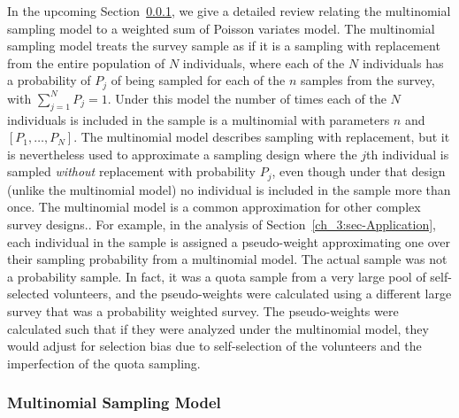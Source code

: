 In the upcoming Section~\ref{ch_3:sec-MultPoisson}, we give a detailed review relating the multinomial sampling model to a weighted sum of Poisson variates model.
The multinomial sampling model treats the survey sample as if it is a sampling with replacement from the entire population of $N$ individuals, where each of the $N$
individuals has a probability of $P_j$ of being sampled for each of the $n$ samples from the survey, with $\sum_{j=1}^{N} P_j = 1$. Under this model the number of times each of the $N$ individuals
is included in the sample is a multinomial with parameters $n$ and $[P_1,\ldots, P_N]$.
The multinomial model describes sampling with replacement, but it is nevertheless used to approximate a sampling design where the $j$th individual is sampled {\it without} replacement with probability $P_j$, even though under that design (unlike the multinomial model) no individual is included in the sample more than once. The multinomial model is a common approximation for other complex survey designs.\citep[see e.g.,][p. 14]{Korn:1999}.
For example, in the \citet{Kali:2021} analysis of Section~\ref{ch_3:sec-Application}, each individual in the sample is assigned a pseudo-weight approximating one over their sampling probability from
a multinomial model. The actual sample was not a probability sample. In fact, it was a quota sample from a very large pool of self-selected volunteers, and the pseudo-weights were calculated using a different large survey that was a probability weighted survey. The pseudo-weights were calculated such that if they were analyzed under the multinomial model, they would adjust for selection bias due to self-selection of the volunteers and the imperfection of the quota sampling.

\subsubsection{Multinomial Sampling Model}
\label{ch_3:sec-MultPoisson}

